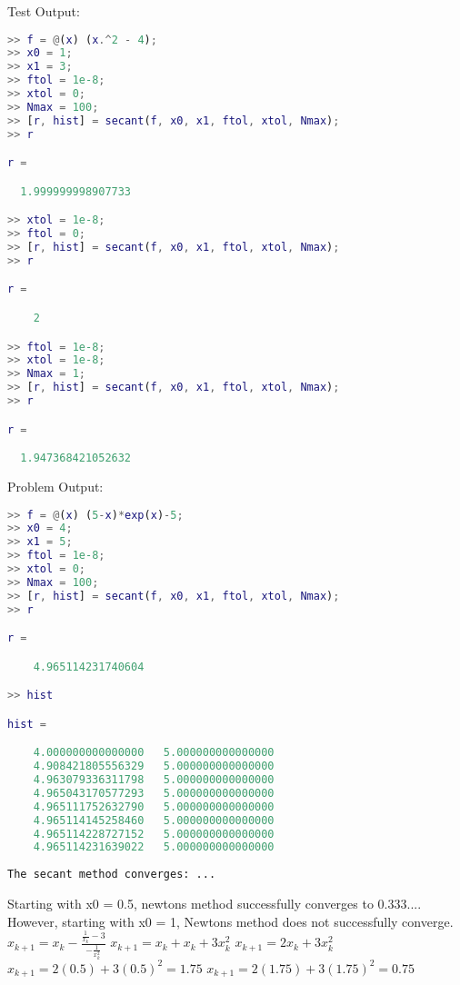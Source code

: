 \documentclass[12pt]{article}
\makeatletter
\theoremstyle{homework}
\newenvironment{exercise}[1]
{\def\@currentlabel{#1}\exercisecore}
{\endexercisecore}
\makeatother
\begin{document}
Test Output:
\begin{lstlisting}[language=Matlab]
>> f = @(x) (x.^2 - 4);
>> x0 = 1;
>> x1 = 3;
>> ftol = 1e-8;
>> xtol = 0;
>> Nmax = 100;
>> [r, hist] = secant(f, x0, x1, ftol, xtol, Nmax);
>> r

r =

  1.999999998907733

>> xtol = 1e-8;
>> ftol = 0;
>> [r, hist] = secant(f, x0, x1, ftol, xtol, Nmax);
>> r

r =

    2

>> ftol = 1e-8;
>> xtol = 1e-8;
>> Nmax = 1;
>> [r, hist] = secant(f, x0, x1, ftol, xtol, Nmax);
>> r

r =

  1.947368421052632
\end{lstlisting}
Problem Output:
\begin{lstlisting}[language=Matlab]
>> f = @(x) (5-x)*exp(x)-5;
>> x0 = 4;
>> x1 = 5;
>> ftol = 1e-8;
>> xtol = 0;
>> Nmax = 100;
>> [r, hist] = secant(f, x0, x1, ftol, xtol, Nmax);
>> r

r =

    4.965114231740604

>> hist

hist =

    4.000000000000000   5.000000000000000
    4.908421805556329   5.000000000000000
    4.963079336311798   5.000000000000000
    4.965043170577293   5.000000000000000
    4.965111752632790   5.000000000000000
    4.965114145258460   5.000000000000000
    4.965114228727152   5.000000000000000
    4.965114231639022   5.000000000000000
\end{lstlisting}
\begin{verbatim}
The secant method converges: ... 
\end{verbatim}

\begin{exercise}{Chapter 4: 3}
\end{exercise}
Starting with x0 = 0.5, newtons method successfully converges
to 0.333.... However, starting with x0 = 1, Newtons method does
not successfully converge.
\newline
$x_{k+1} = x_{k} - \frac{\frac{1}{x_k}-3}{-\frac{1}{x_k^2}}$
\newline
$x_{k+1} = x_{k} + x_{k} + 3x_k^2$
\newline
$x_{k+1} = 2x_k+3x_k^2$
\newline
$x_{k+1} = 2(0.5) + 3(0.5)^2 = 1.75$
\newline 
$x_{k+1} = 2(1.75) +3 (1.75)^2 = 0.75$
\newline
\begin{verbatim}
\end{verbatim}
\end{document}
